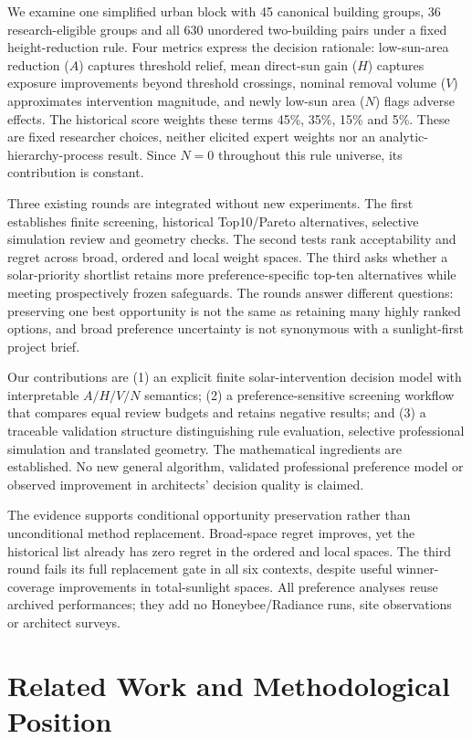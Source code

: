 \documentclass{llncs}
\begin{document}
We examine one simplified urban block with 45 canonical building groups, 36 research-eligible groups and all 630 unordered two-building pairs under a fixed height-reduction rule. Four metrics express the decision rationale: low-sun-area reduction ($A$) captures threshold relief, mean direct-sun gain ($H$) captures exposure improvements beyond threshold crossings, nominal removal volume ($V$) approximates intervention magnitude, and newly low-sun area ($N$) flags adverse effects. The historical score weights these terms 45\%, 35\%, 15\% and 5\%. These are fixed researcher choices, neither elicited expert weights nor an analytic-hierarchy-process result. Since $N=0$ throughout this rule universe, its contribution is constant.

Three existing rounds are integrated without new experiments. The first establishes finite screening, historical Top10/Pareto alternatives, selective simulation review and geometry checks. The second tests rank acceptability and regret across broad, ordered and local weight spaces. The third asks whether a solar-priority shortlist retains more preference-specific top-ten alternatives while meeting prospectively frozen safeguards. The rounds answer different questions: preserving one best opportunity is not the same as retaining many highly ranked options, and broad preference uncertainty is not synonymous with a sunlight-first project brief.

Our contributions are (1) an explicit finite solar-intervention decision model with interpretable $A/H/V/N$ semantics; (2) a preference-sensitive screening workflow that compares equal review budgets and retains negative results; and (3) a traceable validation structure distinguishing rule evaluation, selective professional simulation and translated geometry. The mathematical ingredients are established. No new general algorithm, validated professional preference model or observed improvement in architects' decision quality is claimed.

The evidence supports conditional opportunity preservation rather than unconditional method replacement. Broad-space regret improves, yet the historical list already has zero regret in the ordered and local spaces. The third round fails its full replacement gate in all six contexts, despite useful winner-coverage improvements in total-sunlight spaces. All preference analyses reuse archived performances; they add no Honeybee/Radiance runs, site observations or architect surveys.

\section{Related Work and Methodological Position}
\end{document}
